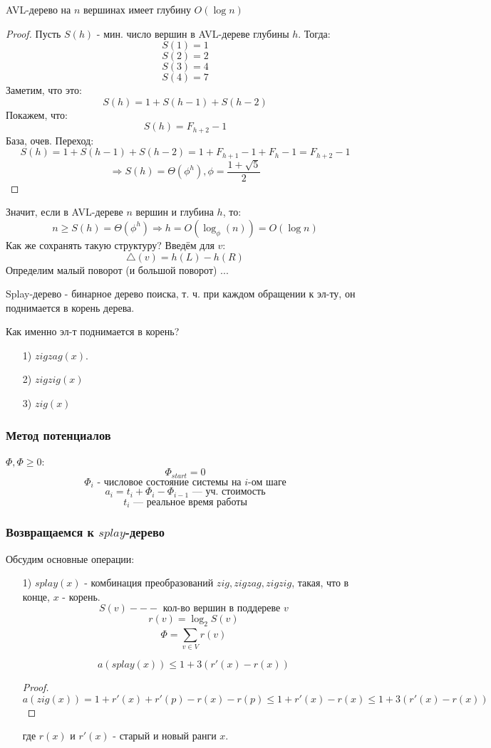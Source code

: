 \begin{statement}
AVL-дерево на $n$ вершинах имеет глубину $O(\log n)$
\end{statement}
\begin{proof}
Пусть $S(h)$ - мин. число вершин в AVL-дереве глубины $h$. Тогда:
\[
S(1) = 1
\]
\[
S(2) = 2
\]
\[
S(3) = 4
\]
\[
S(4) = 7
\]
Заметим, что это:
\[
S(h) = 1 + S(h - 1) + S(h - 2)
\]
Покажем, что:
\[
S(h) = F_{h + 2} - 1
\]
База, очев. Переход:
\[
S(h) = 1 + S(h -1 ) + S(h - 2) = 1 + F_{h + 1} - 1 + F_{h} - 1 = F_{h + 2} - 1
\]
\[
\Rightarrow S(h) = \Theta(\phi^{h}), \phi = \frac{1 + \sqrt{5}}{2}
\]
\end{proof}
Значит, если в AVL-дереве $n$ вершин и глубина $h$, то:
\[
n \geq S(h) = \Theta(\phi^{h}) \Rightarrow h = O(\log_{\phi}(n)) = O(\log n)
\]
Как же сохранять такую структуру? Введём для $v$:
\[
  \triangle(v) = h(L) - h(R)
\]
Определим малый поворот (и большой поворот) ... \\

\begin{definition}
  Splay-дерево - бинарное дерево поиска, т. ч. при каждом обращении к эл-ту, он поднимается в корень дерева.
\end{definition}
 Как именно эл-т поднимается в корень?
 \begin{itemize}
   \item [1) ] $zigzag(x)$.
   \item [2) ] $zigzig(x)$
   \item [3) ] $zig(x)$
 \end{itemize}
 \subsubsection{Метод потенциалов}
 $\Phi, \Phi \geq 0$:
 \[
 \Phi_{start} = 0
 \]
 \[
 \Phi_i \text{ - числовое состояние системы на $i$-ом шаге}
 \]
 \[
 a_i = t_i + \Phi_{i} - \Phi_{i - 1} \text{ --- уч. стоимость}
 \]
 \[
 t_i \text{ --- реальное время работы}
 \]
 \subsubsection{Возвращаемся к $splay$-дерево}
 Обсудим основные операции:
 \begin{itemize}
   \item [1) ] $splay(x)$ - комбинация преобразований $zig, zigzag, zigzig$, такая, что в конце, $x$ - корень.
     \[
     S(v) --- \text{ кол-во вершин в поддереве $v$}
     \]
     \[
     r(v) = \log_2 S(v)
     \]
     \[
     \Phi = \sum_{v \in V}^{} r(v)
     \]
     \begin{statement}
     \[
     a(splay(x)) \leq 1 + 3(r'(x) - r(x))
     \]
     \begin{proof}
     \[
     a(zig(x)) = 1 + r'(x) + r'(p) - r(x) - r(p) \leq 1 + r'(x) - r(x) \leq 1 + 3(r'(x) - r(x))
     \]
     \end{proof}
     где $r(x)$ и $r'(x)$ - старый и новый ранги $x$.
     \end{statement}
 \end{itemize}

